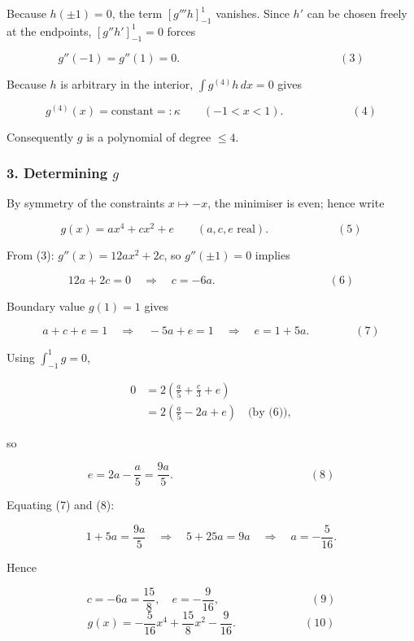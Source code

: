 \documentclass[12pt,a4paper]{article}
\theoremstyle{definition}
\begin{document}
    Because $h(\pm1)=0$, the term $[g'''h]_{-1}^{1}$ vanishes.
    Since $h'$ can be chosen freely at the endpoints, $[g''h']_{-1}^{1}=0$ forces

    $$g''(-1)=g''(1)=0. \qquad\qquad\qquad\qquad\qquad\qquad\qquad (3)$$

    Because $h$ is arbitrary in the interior, $\int g^{(4)}h \, dx=0$ gives

    $$g^{(4)}(x)=\text{constant}=:\kappa\quad\quad(-1<x<1). \qquad\qquad\qquad (4)$$

    Consequently $g$ is a polynomial of degree $\leq 4$.

    \hrulefill
    \subsubsection*{3. Determining $g$}
    \hrulefill

    By symmetry of the constraints $x\mapsto-x$, the minimiser is even; hence write

    $$g(x)=ax^4+cx^2+e\quad\quad(a,c,e \text{ real}). \qquad\qquad\qquad (5)$$

    From (3): $g''(x)=12ax^2+2c$, so $g''(\pm1)=0$ implies

    $$12a+2c=0\quad\Rightarrow\quad c=-6a. \qquad\qquad\qquad\qquad\qquad (6)$$

    Boundary value $g(1)=1$ gives

    $$a+c+e=1\quad\Rightarrow\quad-5a+e=1\quad\Rightarrow\quad e=1+5a. \qquad\qquad (7)$$

    Using $\int_{-1}^{1}g=0$,

    \begin{align}
        0 &= 2\left( \frac{a}{5} + \frac{c}{3} + e \right)\\
        &= 2\left( \frac{a}{5} - 2a + e \right) \quad\text{(by (6))},
    \end{align}

    so

    $$e = 2a - \frac{a}{5} = \frac{9a}{5}. \qquad\qquad\qquad\qquad\qquad\qquad (8)$$

    Equating (7) and (8):

    $$1 + 5a = \frac{9a}{5} \quad\Rightarrow\quad 5 + 25a = 9a \quad\Rightarrow\quad a = -\frac{5}{16}.$$

    Hence

    $$c = -6a = \frac{15}{8},\quad e = -\frac{9}{16}, \qquad\qquad\qquad\qquad (9)$$
    $$g(x)= -\frac{5}{16}x^{4} + \frac{15}{8}x^{2} - \frac{9}{16}.  \qquad\qquad\qquad (10)$$
\end{document}
